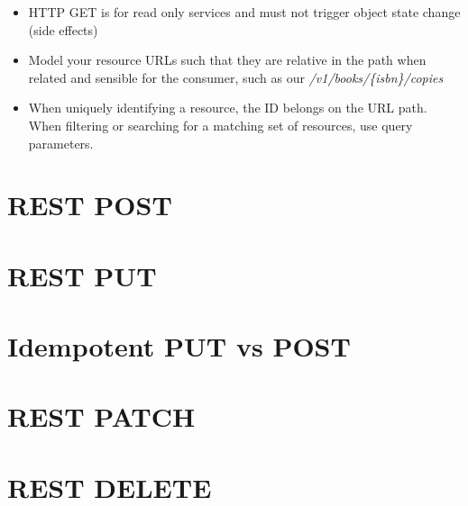 \begin{itemize}
  \item HTTP GET is for read only services and must not trigger object state change (side effects)
  \item Model your resource URLs such that they are relative in the path when related and sensible for the consumer, such as our \textit{/v1/books/\{isbn\}/copies}
  \item When uniquely identifying a resource, the ID belongs on the URL path.  When filtering or searching for a matching set of resources, use query parameters.
\end{itemize}

\section{REST POST}
\section{REST PUT}
\section{Idempotent PUT vs POST}
\section{REST PATCH}
\section{REST DELETE}
